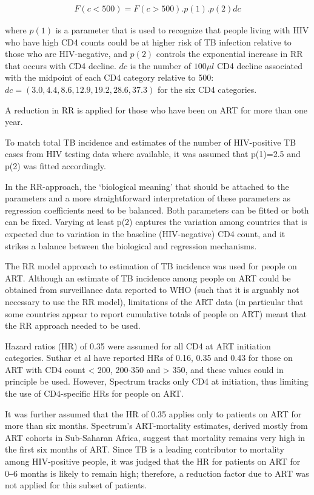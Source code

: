 \begin{align*}
F(c<500) = F(c>500).p(1).p(2)dc
\end{align*}

where $p(1)$ is a parameter that is used to recognize that people living with HIV who have high CD4 counts could be at higher risk of TB infection relative to those who are HIV-negative, and $p(2)$ controls the exponential increase in RR that occurs with CD4 decline. $dc$ is the  number of $100\mu l$ CD4 decline associated with the midpoint of each CD4 category relative to 500: $dc= (3.0, 4.4, 8.6, 12.9, 19.2, 28.6, 37.3)$ for the six CD4 categories.

A reduction in RR is applied for those who have been on ART for more than one year.

To match total TB incidence and estimates of the number of HIV-positive TB cases from HIV testing data where available, it was assumed that p(1)=2.5 and p(2) was fitted accordingly.  

In the RR-approach, the ‘biological meaning’ that should be attached to the parameters and a more straightforward interpretation of these parameters as regression coefficients need to be balanced. Both parameters can be fitted or both can be fixed. Varying at least p(2) captures the variation among countries that is expected due to variation in the baseline (HIV-negative) CD4 count, and it strikes a balance between the biological and regression mechanisms.

The RR model approach to estimation of TB incidence was used for people on ART. Although an estimate of TB incidence among people on ART could be obtained from surveillance data reported to WHO (such that it is arguably not necessary to use the RR model), limitations of the ART data (in particular that some countries appear to report cumulative totals of people on ART) meant that the RR approach needed to be used. 

Hazard ratios (HR) of 0.35 were assumed for all CD4 at ART initiation categories. Suthar et al have reported HRs of 0.16, 0.35 and 0.43 for those on ART with CD4 count < 200, 200-350 and > 350,\cite{22911011} and these values could in principle be used. However, Spectrum tracks only CD4 at initiation, thus limiting the use of CD4-specific HRs for people on ART. 

It was further assumed that the HR of 0.35 applies only to patients on ART for more than six months. Spectrum’s ART-mortality estimates, derived mostly from ART cohorts in Sub-Saharan Africa, suggest that mortality remains very high in the first six months of ART. Since TB is a leading contributor to mortality among HIV-positive people, it was judged that the HR for patients on ART for 0‒6 months is likely to remain high; therefore, a reduction factor due to ART was not applied for this subset of patients.

